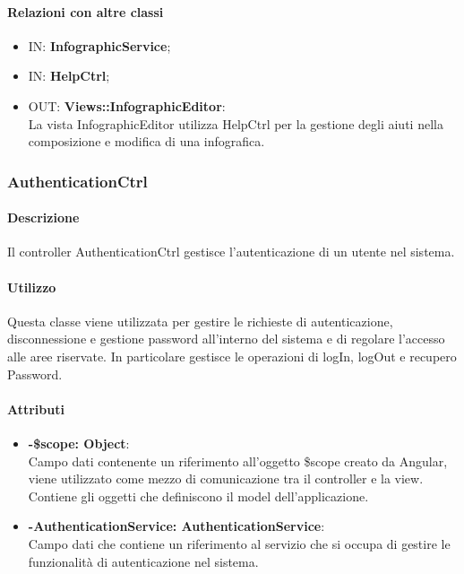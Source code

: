 	\paragraph{Relazioni con altre classi}
	\begin{itemize}
		\item IN: \textbf{InfographicService};
		\item IN: \textbf{HelpCtrl};
		\item OUT: \textbf{Views::InfographicEditor}:\\
			La vista InfographicEditor utilizza HelpCtrl per la gestione degli aiuti nella composizione e modifica di una infografica. 	
	\end{itemize}
	
\subsubsection{AuthenticationCtrl}	
\paragraph{Descrizione}
	Il controller AuthenticationCtrl gestisce l'autenticazione di un utente nel sistema.
	
	\paragraph{Utilizzo}
	Questa classe viene utilizzata per gestire le richieste di autenticazione, disconnessione e gestione password all'interno del sistema e di regolare l'accesso alle aree riservate.
	In particolare gestisce le operazioni di logIn, logOut e recupero Password.
	\paragraph{Attributi}
	\begin{itemize}
		\item \textbf{-\$scope: Object}:\\
			Campo dati contenente un riferimento all'oggetto \$scope creato da Angular, viene utilizzato come mezzo di comunicazione tra il controller e la view. Contiene gli oggetti che definiscono il model dell'applicazione.
		\item \textbf{-AuthenticationService: AuthenticationService}:\\
			Campo dati che contiene un riferimento al servizio che si occupa di gestire le funzionalità di autenticazione nel sistema.
	\end{itemize}
	
